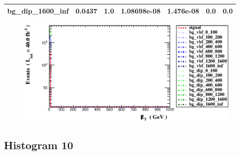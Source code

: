 \documentclass[a4paper, 10pt]{article}
\begin{document}
\begin{table}[H]
\begin{center}
\begin{tabular}{|m{23.0mm}|m{23.0mm}|m{18.0mm}|m{19.0mm}|m{19.0mm}|m{19.0mm}|m{19.0mm}|}
      \hline
      {\cellcolor{white}         bg\_dip\_1600\_inf}& {\cellcolor{white}         0.0437}& {\cellcolor{white}         1.0}& {\cellcolor{white}         1.08698e-08}& {\cellcolor{white}         1.476e-08}& {\cellcolor{green}         0.0}& {\cellcolor{green}         0.0}\\
\hline
    \end{tabular}
  \end{center}
\end{table}

\begin{figure}[H]
  \begin{center}
    \includegraphics[scale=0.45]{selection_8.eps}\\
\caption{   }
  \end{center}
\end{figure}
      \newpage
\subsection{ Histogram 10}
\end{document}
